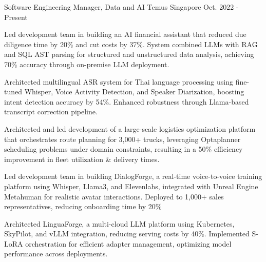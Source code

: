 

\begin{cventries}

  \cventry
    {Software Engineering Manager, Data and AI} %
    {Temus} %
    {Singapore} %
    {Oct. 2022 - Present} %
    {
      \begin{cvitems} %
        \item {Led development team in building an AI financial assistant that reduced due diligence time by 20\% and cut costs by 37\%. System combined LLMs with RAG and SQL AST parsing for structured and unstructured data analysis, achieving 70\% accuracy through on-premise LLM deployment.}
        \item{Architected multilingual ASR system for Thai language processing using fine-tuned Whisper, Voice Activity Detection, and Speaker Diarization, boosting intent detection accuracy by 54\%. Enhanced robustness through Llama-based transcript correction pipeline.}
        \item{Architected and led development of a large-scale logistics optimization platform that orchestrates route planning for 3,000+ trucks, leveraging Optaplanner scheduling problems under domain constraints, resulting in a 50\% efficiency improvement in fleet utilization \& delivery times.}
        \item{Led development team in building DialogForge, a real-time voice-to-voice training platform using Whisper, Llama3, and Elevenlabs, integrated with Unreal Engine Metahuman for realistic avatar interactions. Deployed to 1,000+ sales representatives, reducing onboarding time by 20\%}
        \item{Architected LinguaForge, a multi-cloud LLM platform using Kubernetes, SkyPilot, and vLLM integration, reducing serving costs by 40\%. Implemented S-LoRA orchestration for efficient adapter management, optimizing model performance across deployments.}
      \end{cvitems}
    }


\end{cventries}
